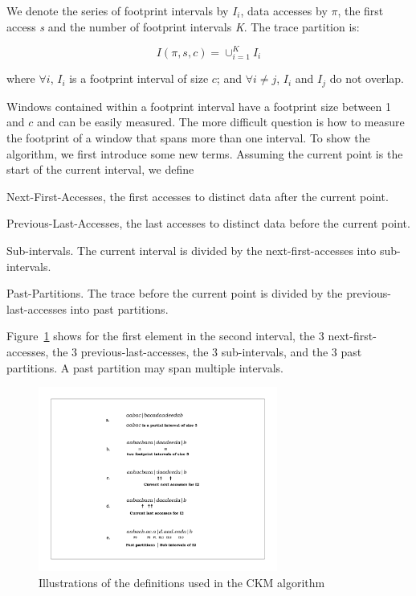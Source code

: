 We denote the series of footprint intervals by \emph{$I_i$},
data accesses by \emph{$\pi$}, the first access \emph{s} and the number
of footprint intervals \emph{K}. The trace partition is:

\[
I(\pi,s,c)=\cup_{i=1}^K I_i
\]

\noindent where $\forall i$, $I_i$ is a footprint interval
of size $c$; and $\forall i\ne j$, $I_i$ and $I_j$ do not overlap. 

Windows contained within a footprint interval have a footprint size
between 1 and $c$ and can be easily measured.  The more difficult
question is how to measure the footprint of a window that spans more
than one interval.  To show the algorithm, we first introduce some new
terms.  Assuming the current point is the start of the current
interval, we define

\begin{definition} {\sc Next-First-Accesses}, the first
  accesses to distinct data after the current point.
\label{cna}
\end{definition}

\begin{definition} {\sc Previous-Last-Accesses}, the last
  accesses to distinct data before the current point.
\label{cla}
\end{definition}

\begin{definition} {\sc Sub-intervals.} The current interval is divided
by the next-first-accesses into sub-intervals.
\end{definition}

\begin{definition} {\sc Past-Partitions.} The trace before the current
  point is divided by the previous-last-accesses into past partitions.
\end{definition}

\noindent Figure~\ref{fig:fp-illus2} shows for the first element in the
second interval, the 3 next-first-accesses, the 3
previous-last-accesses, the 3 sub-intervals, and the 3 past
partitions.  A past partition may span multiple intervals.

\begin{figure}[ht]
  \centering
  \includegraphics[width=0.7\textwidth]{figures/fp/pact09-illustration2}
\caption{Illustrations of the definitions used in the CKM algorithm}
\label{fig:fp-illus2}
\end{figure}

